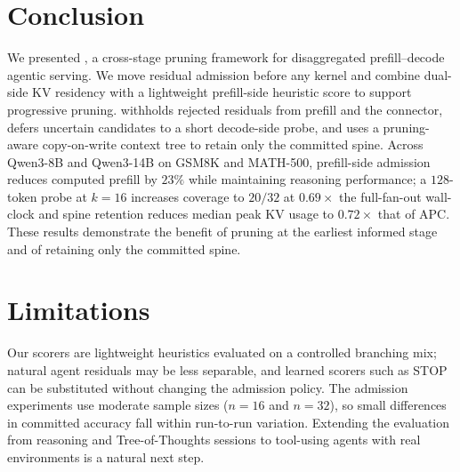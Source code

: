 \section{Conclusion}
\label{sec:conclusion}

We presented \sys, a cross-stage pruning framework for disaggregated prefill--decode agentic serving.
We move residual admission before any kernel and combine dual-side KV residency with a lightweight prefill-side heuristic score to support progressive pruning.
\sys withholds rejected residuals from prefill and the connector, defers uncertain candidates to a short decode-side probe, and uses a pruning-aware copy-on-write context tree to retain only the committed spine.
Across Qwen3-8B and Qwen3-14B on GSM8K and MATH-500, prefill-side admission reduces computed prefill by $23\%$ while maintaining reasoning performance; a $128$-token probe at $k{=}16$ increases coverage to $20/32$ at $0.69\times$ the full-fan-out wall-clock and spine retention reduces median peak KV usage to $0.72\times$ that of APC.
These results demonstrate the benefit of pruning at the earliest informed stage and of retaining only the committed spine.

\section*{Limitations}
\label{sec:limitations}

Our scorers are lightweight heuristics evaluated on a controlled branching mix; natural agent residuals may be less separable, and learned scorers such as STOP~\cite{stoploss} can be substituted without changing the admission policy.
The admission experiments use moderate sample sizes ($n{=}16$ and $n{=}32$), so small differences in committed accuracy fall within run-to-run variation.
Extending the evaluation from reasoning and Tree-of-Thoughts sessions to tool-using agents with real environments is a natural next step.
